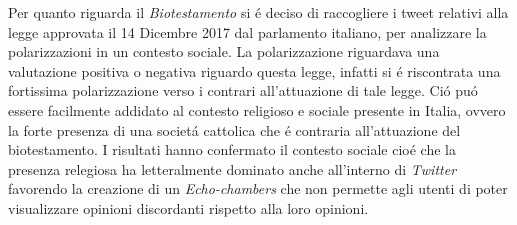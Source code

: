 Per quanto riguarda il \textit{Biotestamento} si \'e deciso di raccogliere i tweet relativi alla legge approvata il 14 Dicembre 2017 dal parlamento italiano, per analizzare la polarizzazioni in un contesto sociale.
La polarizzazione riguardava una valutazione positiva o negativa riguardo questa legge, infatti si \'e riscontrata una fortissima polarizzazione verso i contrari all'attuazione di tale legge. Ci\'o pu\'o essere facilmente addidato al contesto religioso e sociale presente in Italia, ovvero la forte presenza di una societ\'a cattolica che \'e contraria  all'attuazione del biotestamento. I risultati hanno confermato il contesto sociale cio\'e che la presenza relegiosa ha letteralmente dominato anche all'interno di \textit{Twitter} favorendo la creazione di un \textit{Echo-chambers} che non permette agli utenti di poter visualizzare opinioni discordanti rispetto alla loro opinioni.

